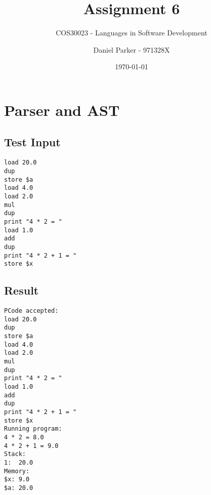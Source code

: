 \documentclass[11pt, numbers=endperiod, parskip=half]{scrartcl}
\title{Assignment 6}
\subtitle{COS30023 - Languages in Software Development}
\author{Daniel Parker - 971328X}
\date{\today}
\begin{document}

\maketitle
\section{Parser and AST}
\subsection{Test Input}
\begin{verbatim}
load 20.0
dup
store $a
load 4.0
load 2.0
mul
dup
print "4 * 2 = "
load 1.0
add
dup
print "4 * 2 + 1 = "
store $x
\end{verbatim}

\subsection{Result}
\begin{verbatim}
PCode accepted:
load 20.0
dup
store $a
load 4.0
load 2.0
mul
dup
print "4 * 2 = "
load 1.0
add
dup
print "4 * 2 + 1 = "
store $x
Running program:
4 * 2 = 8.0
4 * 2 + 1 = 9.0
Stack:
1:	20.0
Memory:
$x:	9.0
$a:	20.0
\end{verbatim}
\end{document}
